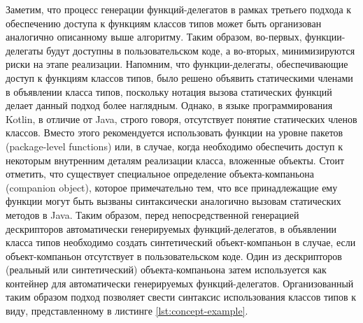 Заметим, что процесс генерации функций-делегатов в рамках третьего подхода к обеспечению доступа к функциям классов типов может быть организован аналогично описанному выше алгоритму. Таким образом, во-первых, функции-делегаты будут доступны в пользовательском коде, а во-вторых, минимизируются риски на этапе реализации. Напомним, что функции-делегаты, обеспечивающие доступ к функциям классов типов, было решено объявить статическими членами в объявлении класса типов, поскольку нотация вызова статических функций делает данный подход более наглядным. Однако, в языке программирования Kotlin, в отличие от Java, строго говоря, отсутствует понятие статических членов классов. Вместо этого рекомендуется использовать функции на уровне пакетов (package-level functions) или, в случае, когда необходимо обеспечить доступ к некоторым внутренним деталям реализации класса, вложенные объекты. Стоит отметить, что существует специальное определение объекта-компаньона (companion object), которое примечательно тем, что все принадлежащие ему функции могут быть вызваны синтаксически аналогично вызовам статических методов в Java. Таким образом, перед непосредственной генерацией дескрипторов автоматически генерируемых функций-делегатов, в объявлении класса типов необходимо создать синтетический объект-компаньон в случае, если объект-компаньон отсутствует в пользовательском коде. Один из дескрипторов (реальный или синтетический) объекта-компаньона затем используется как контейнер для автоматически генерируемых функций-делегатов. Организованный таким образом подход позволяет свести синтаксис использования классов типов к виду, представленному в листинге \ref{lst:concept-example}.

